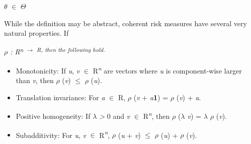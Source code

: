 \documentclass[12pt,twoside]{article}
\begin{document}
\begin{adjustwidth}{0.85in}{0.13in}
\begin{Center}
{\fontsize{7pt}{8.4pt}\selectfont \textit{$ \theta $ }$ \in $ $ \Theta $ \par}
\end{Center}\par

\end{adjustwidth}

\begin{adjustwidth}{0.58in}{0.0in}
{\fontsize{10pt}{12.0pt}\selectfont While the definition may be abstract, coherent risk measures have several very natural properties. If\par}\par

\end{adjustwidth}

\begin{adjustwidth}{0.58in}{0.0in}
{\fontsize{10pt}{12.0pt}\selectfont \textit{$ \rho $  : R\textsuperscript{n $ \rightarrow $  R, then the following hold.}}\par}\par

\end{adjustwidth}

\begin{itemize}
	\item {\fontsize{10pt}{12.0pt}\selectfont Monotonicity: If \textit{u}, \textit{v }$ \in $  R\textit{\textsuperscript{n} }are vectors where \textit{u }is component-wise larger than \textit{v}, then \textit{$ \rho $ }(\textit{v}) $ \leq $  \textit{$ \rho $ }(\textit{u}).\par}\par

	\item {\fontsize{10pt}{12.0pt}\selectfont Translation invariance: For \textit{a }$ \in $  R, \textit{$ \rho $ }(\textit{v }+ \textit{a}\textbf{1}) = \textit{$ \rho $ }(\textit{v}) + \textit{a}.\par}\par

	\item {\fontsize{10pt}{12.0pt}\selectfont Positive homogeneity: If \textit{$ \lambda $  > }0 and \textit{v }$ \in $  R\textit{\textsuperscript{n}}, then \textit{$ \rho $ }(\textit{$ \lambda $ v}) = \textit{$ \lambda $ $ \rho $ }(\textit{v}).\par}\par

	\item {\fontsize{10pt}{12.0pt}\selectfont Subadditivity: For \textit{u}, \textit{v }$ \in $  R\textit{\textsuperscript{n}}, \textit{$ \rho $ }(\textit{u }+ \textit{v}) $ \leq $  \textit{$ \rho $ }(\textit{u}) + \textit{$ \rho $ }(\textit{v}).\par}
\end{itemize}\par
\end{document}
